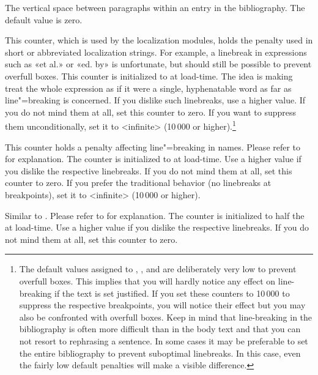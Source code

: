 \begin{ltxsyntax}

The vertical space between paragraphs within an entry in the bibliography. The default value is zero.


This counter, which is used by the localization modules, holds the penalty used in short or abbreviated localization strings. For example, a linebreak in expressions such as «et al.» or «ed. by» is unfortunate, but should still be possible to prevent overfull boxes. This counter is initialized to  at load-time. The idea is making \tex treat the whole expression as if it were a single, hyphenatable word as far as line"=breaking is concerned. If you dislike such linebreaks, use a higher value. If you do not mind them at all, set this counter to zero. If you want to suppress them unconditionally, set it to <infinite> (10\,000 or higher).\footnote{The default values assigned to , , and  are deliberately very low to prevent overfull boxes. This implies that you will hardly notice any effect on line-breaking if the text is set justified. If you set these counters to 10\,000 to suppress the respective breakpoints, you will notice their effect but you may also be confronted with overfull boxes. Keep in mind that line-breaking in the bibliography is often more difficult than in the body text and that you can not resort to rephrasing a sentence. In some cases it may be preferable to set the entire bibliography  to prevent suboptimal linebreaks. In this case, even the fairly low default penalties will make a visible difference.}


This counter holds a penalty affecting line"=breaking in names. Please refer to  for explanation. The counter is initialized to  at load-time. Use a higher value if you dislike the respective linebreaks. If you do not mind them at all, set this counter to zero. If you prefer the traditional \bibtex behavior (no linebreaks at  breakpoints), set it to <infinite> (10\,000 or higher).


Similar to . Please refer to  for explanation. The counter is initialized to half the  at load-time. Use a higher value if you dislike the respective linebreaks. If you do not mind them at all, set this counter to zero.

\end{ltxsyntax}

